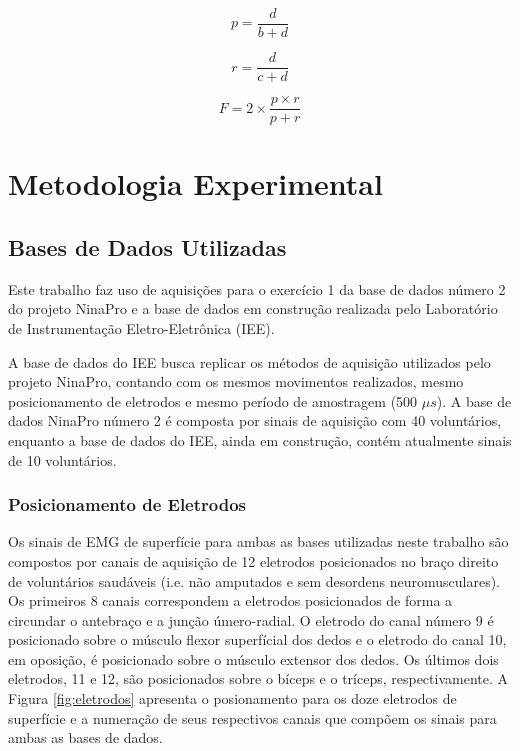 \begin{equation}
\label{eq:precisao}
	p = \frac{d}{b+d}
\end{equation}

\begin{equation}
\label{eq:sensitividade}
	r = \frac{d}{c+d}
\end{equation}

\begin{equation}
\label{eq:fscore}
	F = 2 \times \frac{p \times r}{p+r}
\end{equation}

	\chapter{Metodologia Experimental}

		\section{Bases de Dados Utilizadas}
Este trabalho faz uso de aquisições para o exercício 1 da base de dados número 2 do projeto NinaPro \cite{Gijsberts2014} e a base de dados em construção realizada pelo Laboratório de Instrumentação Eletro-Eletrônica (IEE).

A base de dados do IEE busca replicar os métodos de aquisição utilizados pelo projeto NinaPro, contando com os mesmos movimentos realizados, mesmo posicionamento de eletrodos e mesmo período de amostragem (500 $\mu s$). A base de dados NinaPro número 2 é composta por sinais de aquisição com 40 voluntários, enquanto a base de dados do IEE, ainda em construção, contém atualmente sinais de 10 voluntários.

			\subsection{Posicionamento de Eletrodos}
Os sinais de EMG de superfície para ambas as bases utilizadas neste trabalho são compostos por canais de aquisição de 12 eletrodos posicionados no braço direito de voluntários saudáveis (i.e. não amputados e sem desordens neuromusculares). Os primeiros 8 canais correspondem a eletrodos posicionados de forma a circundar o antebraço e a junção úmero-radial. O eletrodo do canal número 9 é posicionado sobre o músculo flexor superfícial dos dedos e o eletrodo do canal 10, em oposição, é posicionado sobre o músculo extensor dos dedos. Os últimos dois eletrodos, 11 e 12, são posicionados sobre o bíceps e o tríceps, respectivamente. A Figura \ref{fig:eletrodos} apresenta o posionamento para os doze eletrodos de superfície e a numeração de seus respectivos canais que compõem os sinais para ambas as bases de dados.

